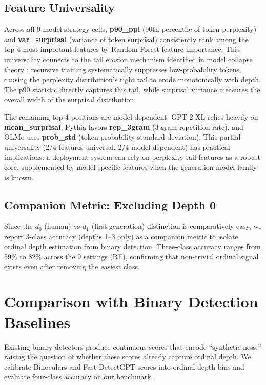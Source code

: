 \documentclass[11pt,a4paper]{article}
\begin{document}
\subsection{Feature Universality}

Across all 9 model-strategy cells, \textbf{p90\_ppl} (90th percentile of token perplexity) and \textbf{var\_surprisal} (variance of token surprisal) consistently rank among the top-4 most important features by Random Forest feature importance. This universality connects to the tail erosion mechanism identified in model collapse theory \citep{shumailov2024ai}: recursive training systematically suppresses low-probability tokens, causing the perplexity distribution's right tail to erode monotonically with depth. The p90 statistic directly captures this tail, while surprisal variance measures the overall width of the surprisal distribution.

The remaining top-4 positions are model-dependent: GPT-2 XL relies heavily on \textbf{mean\_surprisal}, Pythia favors \textbf{rep\_3gram} (3-gram repetition rate), and OLMo uses \textbf{prob\_std} (token probability standard deviation). This partial universality (2/4 features universal, 2/4 model-dependent) has practical implications: a deployment system can rely on perplexity tail features as a robust core, supplemented by model-specific features when the generation model family is known.

\subsection{Companion Metric: Excluding Depth 0}

Since the $d_0$ (human) vs $d_1$ (first-generation) distinction is comparatively easy, we report 3-class accuracy (depths 1--3 only) as a companion metric to isolate ordinal depth estimation from binary detection. Three-class accuracy ranges from 59\% to 82\% across the 9 settings (RF), confirming that non-trivial ordinal signal exists even after removing the easiest class.

\section{Comparison with Binary Detection Baselines}
\label{sec:baselines}

Existing binary detectors produce continuous scores that encode ``synthetic-ness,'' raising the question of whether these scores already capture ordinal depth. We calibrate Binoculars \citep{hans2024spotting} and Fast-DetectGPT \citep{bao2024fast} scores into ordinal depth bins and evaluate four-class accuracy on our benchmark.
\end{document}
